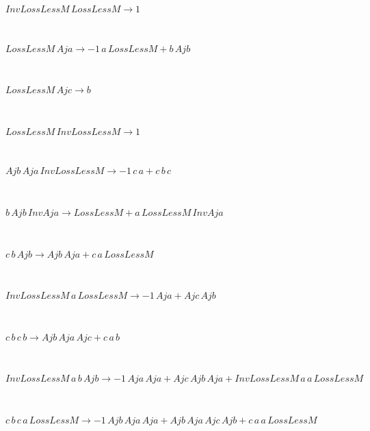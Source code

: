 \begin{minipage}{6in}
$
InvLossLessM\,
 LossLessM\rightarrow 1
$
\end{minipage}\medskip \\
\begin{minipage}{6in}
$
LossLessM\,
 Aja\rightarrow -1\,
 a\,
 LossLessM + b\,
 Ajb
$
\end{minipage}\medskip \\
\begin{minipage}{6in}
$
LossLessM\,
 Ajc\rightarrow b
$
\end{minipage}\medskip \\
\begin{minipage}{6in}
$
LossLessM\,
 InvLossLessM\rightarrow 1
$
\end{minipage}\medskip \\
\begin{minipage}{6in}
$
Ajb\,
 Aja\,
 InvLossLessM\rightarrow -1\,
 c\,
 a + c\,
 b\,
 c
$
\end{minipage}\medskip \\
\begin{minipage}{6in}
$
b\,
 Ajb\,
 InvAja\rightarrow LossLessM + a\,
 LossLessM\,
 InvAja
$
\end{minipage}\medskip \\
\begin{minipage}{6in}
$
c\,
 b\,
 Ajb\rightarrow Ajb\,
 Aja + c\,
 a\,
 LossLessM
$
\end{minipage}\medskip \\
\begin{minipage}{6in}
$
InvLossLessM\,
 a\,
 LossLessM\rightarrow -1\,
 Aja + Ajc\,
 Ajb
$
\end{minipage}\medskip \\
\begin{minipage}{6in}
$
c\,
 b\,
 c\,
 b\rightarrow Ajb\,
 Aja\,
 Ajc + c\,
 a\,
 b
$
\end{minipage}\medskip \\
\begin{minipage}{6in}
$
InvLossLessM\,
 a\,
 b\,
 Ajb\rightarrow -1\,
 Aja\,
 Aja + Ajc\,
 Ajb\,
 Aja + InvLossLessM\,
 a\,
 a\,
 LossLessM
$
\end{minipage}\medskip \\
\begin{minipage}{6in}
$
c\,
 b\,
 c\,
 a\,
 LossLessM\rightarrow -1\,
 Ajb\,
 Aja\,
 Aja + Ajb\,
 Aja\,
 Ajc\,
 Ajb + c\,
 a\,
 a\,
 LossLessM
$
\end{minipage}\medskip \\
